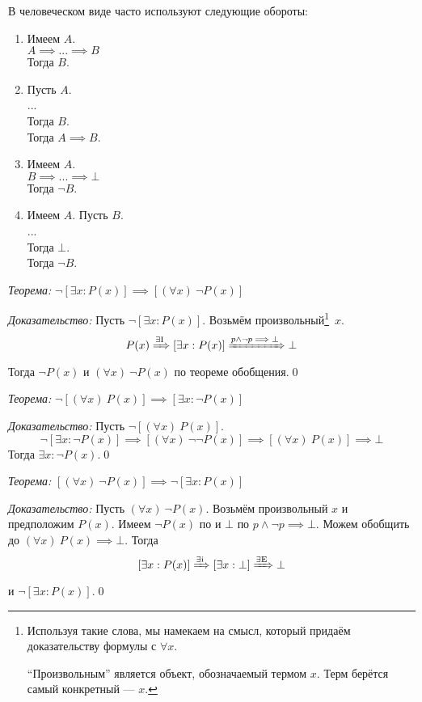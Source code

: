В человеческом виде часто используют следующие обороты:
\begin{multicols}{2}
  \begin{enumerate}[label=(\roman*)]
    \item{}
    Имеем $A$.\\
    $A\implies...\implies B$\\
    Тогда $B$.
    \item{}
    Пусть $A$.\\
    ...\\
    Тогда $B$.\\
    Тогда $A\implies B$.
    \item{}
    Имеем $A$.\\
    $B\implies ...\implies \bot$\\
    Тогда $\lnot B$.
    \item{}
    Имеем $A$. Пусть $B$.\\
    ...\\
    Тогда $\bot$.\\
    Тогда $\lnot B$.
  \end{enumerate}
\end{multicols}

\vspace{1em}
{\it Теорема:} $\lnot[\exists x:P(x)]\implies [(\forall x)~\lnot P(x)]$

{\it Доказательство:}
Пусть ${\lnot[\exists x:P(x)]}$.
Возьмём произвольный\footnote{
  Используя такие слова, мы намекаем на смысл, который придаём доказательству
  формулы с $\forall x$.

  ``Произвольным'' является объект, обозначаемый термом $x$.
  Терм берётся самый конкретный --- $x$.}~$x$.
\[
  P(x)\xRightarrow{\text{$\exists$I{}}} [\exists x:P(x)]
  \xRightarrow{p\land\lnot p\implies \bot} \bot
\]
Тогда $\lnot P(x)$ и $(\forall x)~\lnot P(x)$
по теореме обобщения.\qed

\vspace{1em}
{\it Теорема:} $\lnot[(\forall x)~P(x)]\implies [\exists x:\lnot P(x)]$

{\it Доказательство:}
Пусть $\lnot[(\forall x)~P(x)]$.
\[
  \lnot[\exists x:\lnot P(x)]\implies [(\forall x)~\lnot\lnot P(x)]
  \implies [(\forall x)~P(x)]\implies\bot
\]
Тогда $\exists x:\lnot P(x)$.\qed

\pagebreak
{\it Теорема:} $[(\forall x)~\lnot P(x)]\implies \lnot[\exists x:P(x)]$

{\it Доказательство:}
Пусть $(\forall x)~\lnot P(x)$. Возьмём произвольный $x$
и предположим $P(x)$. Имеем $\lnot P(x)$ по \Ae{} и $\bot$ по
$p\land\lnot p\implies\bot$.
Можем обобщить до $(\forall x)~P(x)\implies \bot$.
Тогда
\[
  [\exists x:P(x)]\xRightarrow{\text{$\exists$i{}}} [\exists x:\bot]
  \xRightarrow{\text{$\exists$E{}}} \bot
\]
и $\lnot[\exists x:P(x)]$.\qed

